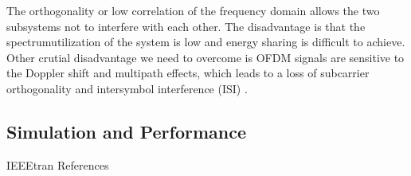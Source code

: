 \documentclass[conference]{IEEEtran}
\begin{document}
The orthogonality or low correlation of the frequency domain allows the two subsystems not to interfere with each other. The disadvantage is that the spectrumutilization of the system is low and energy sharing is difficult to achieve. Other crutial disadvantage we need to overcome is OFDM signals are sensitive to the Doppler shift and multipath effects, which leads to a loss of subcarrier orthogonality and intersymbol interference (ISI) \cite{9992221}.

\subsection {Simulation and Performance}
      


	 {IEEEtran}
	 {References}
	
  
\end{document}
